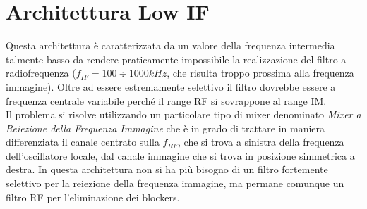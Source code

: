 



\section{Architettura Low IF}
Questa architettura è caratterizzata da un valore della frequenza intermedia talmente basso da rendere praticamente impossibile la realizzazione del filtro a radiofrequenza ($f_{IF} = 100 \div 1000 kHz$, che risulta troppo prossima alla frequenza immagine). Oltre ad essere estremamente selettivo il filtro dovrebbe essere a frequenza centrale variabile perché il range RF si sovrappone al range IM.\\
Il problema si risolve  utilizzando un particolare tipo di mixer denominato \textit{Mixer a Reiezione della Frequenza Immagine} che è in grado di trattare in maniera differenziata il canale centrato sulla $f_{RF}$, che si trova a sinistra della frequenza dell'oscillatore locale, dal canale immagine che si trova in posizione simmetrica a destra.
In questa architettura non si ha più bisogno di un filtro fortemente selettivo per la reiezione della frequenza immagine, ma permane comunque un filtro RF per l'eliminazione dei blockers.

\begin{figure}[h]
	\centering
	\hspace{\fill}
	\hspace{\fill}
	\hspace{\fill}
	\caption{}
	\label{fig:lowif1}
\end{figure}

